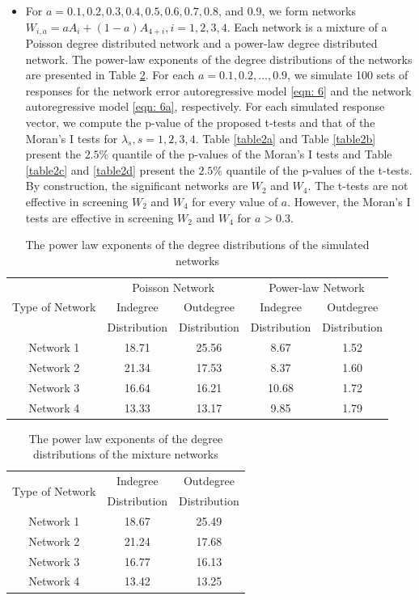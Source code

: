 \documentclass[times, doublespace]{auth}
\begin{document}
\begin{itemize}
	\item For $a = 0.1, 0.2, 0.3, 0.4, 0.5, 0.6, 0.7, 0.8$, and $0.9$, we form networks $W_{i,a} = aA_{i} + (1-a)A_{4+i}, i=1,2,3,4$. Each network is a mixture of a Poisson degree distributed network and a power-law degree distributed network. The power-law exponents of the degree distributions of the networks are presented in Table \ref{table1b}. For each $a=0.1, 0.2, \dots, 0.9$, we simulate 100 sets of responses for the network error autoregressive model \ref{eqn: 6} and the network autoregressive model \ref{eqn: 6a}, respectively. For each simulated response vector, we compute the p-value of the proposed t-tests and that of the Moran's I tests for $\lambda_{s},s=1,2,3,4$. Table \ref{table2a} and Table \ref{table2b} present the $2.5\%$ quantile of the p-values of the Moran's I tests and Table \ref{table2c} and \ref{table2d} present the $2.5\%$ quantile of the p-values of the t-tests. By construction, the significant networks are $W_{2}$ and $W_{4}$. The t-tests are not effective in screening $W_{2}$ and $W_{4}$ for every value of $a$. However, the Moran's I tests are effective in screening $W_{2}$ and $W_{4}$ for $a > 0.3$.
\end{itemize}


\begin{table}
	\centering
	\caption{The power law exponents of the degree distributions of the simulated networks}
	\label{table1a}
	\begin{tabular}{|c|c|c|c|c|}
		\hline
		\multirow{ 3}{*}{Type of Network}&\multicolumn{ 2}{|c|}{Poisson Network} & \multicolumn{ 2}{|c|}{Power-law Network} \\
		& Indegree & Outdegree & Indegree & Outdegree\\
		&Distribution&Distribution&Distribution&Distribution\\
		\hline
		Network 1 & 18.71 & 25.56 & 8.67 & 1.52\\
		\hline
		Network 2 & 21.34 & 17.53 & 8.37 & 1.60\\
		\hline
		Network 3 & 16.64 & 16.21 & 10.68 & 1.72\\
		\hline
		Network 4 & 13.33 & 13.17 & 9.85 & 1.79\\
		\hline
	\end{tabular}
\end{table}

\begin{table}
	\centering
	\caption{The power law exponents of the degree distributions of the mixture networks}
	\label{table1b}
	\begin{tabular}{|c|c|c|}
		\hline
		\multirow{ 2}{*}{Type of Network}& Indegree & Outdegree \\
		&Distribution&Distribution\\
		\hline
		Network 1 & 18.67 & 25.49\\
		\hline
		Network 2 & 21.24 & 17.68\\
		\hline
		Network 3 & 16.77 & 16.13\\
		\hline
		Network 4 & 13.42 & 13.25\\
		\hline
	\end{tabular}
\end{table}
\end{document}

